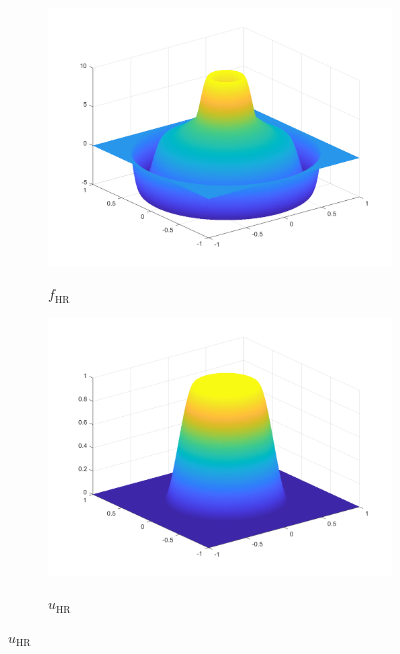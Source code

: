 \begin{figure}[p]
  \centering
  \begin{subfigure}[b]{.48\linewidth}
    \centering
    \caption{$f_\textrm{HR}$}
    \includegraphics[trim = 40 30 30 30, clip, width=\linewidth]
      {pictures/chapExperiments/secExactSol/f04/inSi.png}
    \label{fig:f04InSi}
  \end{subfigure}
  \quad
  \begin{subfigure}[b]{.48\linewidth}
    \centering
    \caption{$u_\textrm{HR}$}
    \includegraphics[trim = 40 30 30 30, clip, width=\linewidth]
      {pictures/chapExperiments/secExactSol/f04/exactSolution.png}
    \label{fig:f04ExactSol}
  \end{subfigure}


\end{figure}

